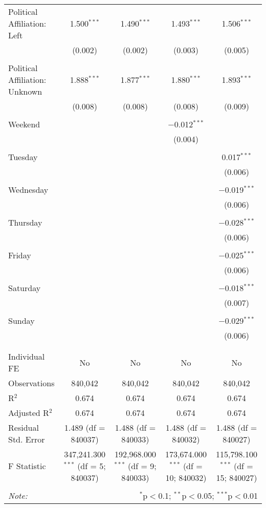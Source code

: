 \documentclass[
]{article}
\begin{document}
\begin{table}[!htbp]
{\begin{tabular}{@{\extracolsep{5pt}}lcccc}
 Political Affiliation: Left & 1.500$^{***}$ & 1.490$^{***}$ & 1.493$^{***}$ & 1.506$^{***}$ \\ 
  & (0.002) & (0.002) & (0.003) & (0.005) \\ 
  & & & & \\ 
 Political Affiliation: Unknown & 1.888$^{***}$ & 1.877$^{***}$ & 1.880$^{***}$ & 1.893$^{***}$ \\ 
  & (0.008) & (0.008) & (0.008) & (0.009) \\ 
  & & & & \\ 
 Weekend &  &  & $-$0.012$^{***}$ &  \\ 
  &  &  & (0.004) &  \\ 
  & & & & \\ 
 Tuesday &  &  &  & 0.017$^{***}$ \\ 
  &  &  &  & (0.006) \\ 
  & & & & \\ 
 Wednesday &  &  &  & $-$0.019$^{***}$ \\ 
  &  &  &  & (0.006) \\ 
  & & & & \\ 
 Thursday &  &  &  & $-$0.028$^{***}$ \\ 
  &  &  &  & (0.006) \\ 
  & & & & \\ 
 Friday &  &  &  & $-$0.025$^{***}$ \\ 
  &  &  &  & (0.006) \\ 
  & & & & \\ 
 Saturday &  &  &  & $-$0.018$^{***}$ \\ 
  &  &  &  & (0.007) \\ 
  & & & & \\ 
 Sunday &  &  &  & $-$0.029$^{***}$ \\ 
  &  &  &  & (0.006) \\ 
  & & & & \\ 
\hline \\[-1.8ex] 
Individual FE & No & No & No & No \\ 
Observations & 840,042 & 840,042 & 840,042 & 840,042 \\ 
R$^{2}$ & 0.674 & 0.674 & 0.674 & 0.674 \\ 
Adjusted R$^{2}$ & 0.674 & 0.674 & 0.674 & 0.674 \\ 
Residual Std. Error & 1.489 (df = 840037) & 1.488 (df = 840033) & 1.488 (df = 840032) & 1.488 (df = 840027) \\ 
F Statistic & 347,241.300$^{***}$ (df = 5; 840037) & 192,968.000$^{***}$ (df = 9; 840033) & 173,674.000$^{***}$ (df = 10; 840032) & 115,798.100$^{***}$ (df = 15; 840027) \\ 
\hline 
\hline \\[-1.8ex] 
\textit{Note:}  & \multicolumn{4}{r}{$^{*}$p$<$0.1; $^{**}$p$<$0.05; $^{***}$p$<$0.01} \\ 
\end{tabular}
} 
\end{table} 
\newpage
\end{document}
